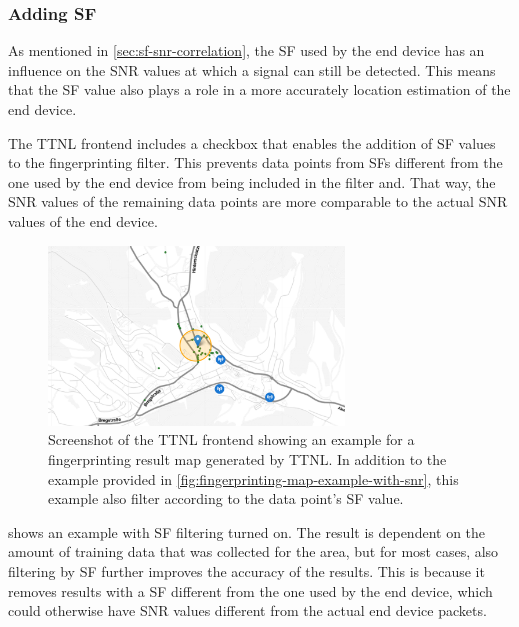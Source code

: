 \subsubsection{Adding \acf{SF}}

As mentioned in \cref{sec:sf-snr-correlation}, the \ac{SF} used by the end device has an influence on the \ac{SNR} values at which a signal can still be detected.
This means that the \ac{SF} value also plays a role in a more accurately location estimation of the end device.

The \ac{TTNL} frontend includes a checkbox that enables the addition of \ac{SF} values to the fingerprinting filter.
This prevents data points from \acp{SF} different from the one used by the end device from being included in the filter and.
That way, the \ac{SNR} values of the remaining data points are more comparable to the actual \ac{SNR} values of the end device.

\begin{figure}[htbp]
    \centering
    \includegraphics[width=0.7\textwidth]{pictures/ttn-locator/frontend/fingerprinting/fingerprinting_map_example_with_snr_sf.png}
    \caption{
        Screenshot of the \ac{TTNL} frontend showing an example for a fingerprinting result map generated by \ac{TTNL}.
        In addition to the example provided in \cref{fig:fingerprinting-map-example-with-snr}, this example also filter according to the data point's \ac{SF} value.
    }\label{fig:fingerprinting-map-example-with-snr-and-sf}
\end{figure}

 shows an example with \ac{SF} filtering turned on.
The result is dependent on the amount of training data that was collected for the area, but for most cases, also filtering by \ac{SF} further improves the accuracy of the results.
This is because it removes results with a \ac{SF} different from the one used by the end device, which could otherwise have \ac{SNR} values different from the actual end device packets.

